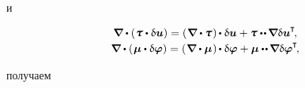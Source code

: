 \begin{otherlanguage}{russian}
\vspace{-0.8em} \noindent и 

\nopagebreak\vspace{-0.2em}\begin{equation*}\begin{array}{c}
\boldnabla \dotp \left( \hspace{.1ex} \forcestresstensor \dotp \variation{\fieldofdisplacements} \right)
= \left( \hspace{.12ex} \boldnabla \dotp \forcestresstensor \hspace{.12ex} \right) \hspace{-0.16ex} \dotp \variation{\fieldofdisplacements}
+ \forcestresstensor \dotdotp \hspace{-0.16ex} \boldnabla \variation{\fieldofdisplacements}^{\hspace{-0.05ex}\T} \hspace{-0.3ex} ,
\\[.25em]
%
\boldnabla \dotp \left( \hspace{.1ex} \couplestresstensor \dotp \variation{\fieldofrotations} \right)
= \left( \hspace{.12ex} \boldnabla \dotp \couplestresstensor \hspace{.12ex} \right) \hspace{-0.16ex} \dotp \variation{\fieldofrotations}
+ \couplestresstensor \dotdotp \hspace{-0.16ex} \boldnabla \variation{\fieldofrotations}^{\hspace{-0.05ex}\T} \hspace{-0.3ex} ,
\end{array}\end{equation*}

\vspace{-0.4em} \noindent получаем


\end{otherlanguage}
